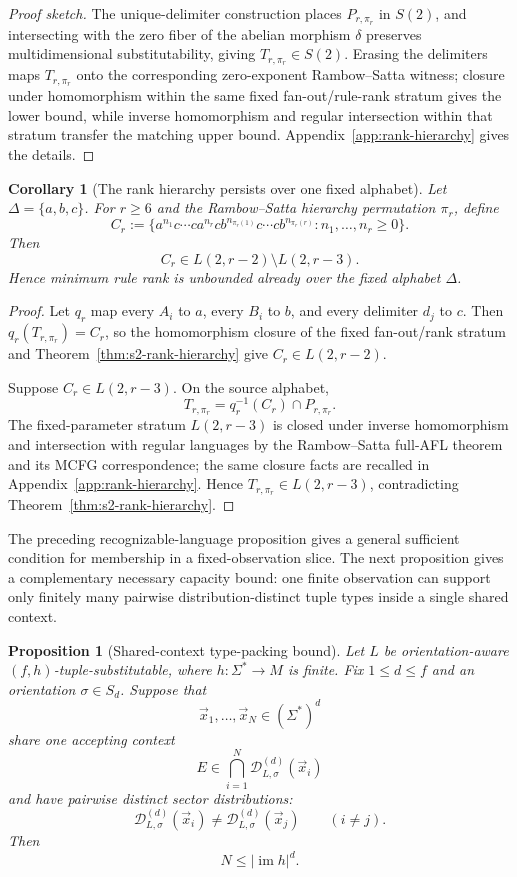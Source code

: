 \documentclass[11pt,a4paper]{article}
\numberwithin{equation}{section}
\theoremstyle{plain}
\newtheorem{proposition}[theorem]{Proposition}
\newtheorem{corollary}[theorem]{Corollary}
\theoremstyle{definition}
\theoremstyle{remark}
\newcommand{\D}{\mathcal{D}}
\newcommand{\tuple}[1]{\vec{#1}}
\begin{document}
\begin{proof}[Proof sketch]
The unique-delimiter construction places $P_{r,\pi_r}$ in $S(2)$, and
intersecting with the zero fiber of the abelian morphism $\delta$ preserves
multidimensional substitutability, giving $T_{r,\pi_r}\in S(2)$.  Erasing the
delimiters maps $T_{r,\pi_r}$ onto the corresponding zero-exponent
Rambow--Satta witness; closure under homomorphism within the same fixed
fan-out/rule-rank stratum gives the lower bound, while inverse homomorphism and
regular intersection within that stratum transfer the matching upper bound.  Appendix~\ref{app:rank-hierarchy} gives the details.
\end{proof}


\begin{corollary}[The rank hierarchy persists over one fixed alphabet]
\label{cor:fixed-alphabet-rank-hierarchy}
Let $\Delta=\{a,b,c\}$.  For $r\ge6$ and the Rambow--Satta hierarchy
permutation $\pi_r$, define
\[
 C_r:=\{a^{n_1}c\cdots ca^{n_r}c
 b^{n_{\pi_r(1)}}c\cdots cb^{n_{\pi_r(r)}}:
 n_1,\ldots,n_r\ge0\}.
\]
Then
\[
  C_r\in L(2,r-2)\setminus L(2,r-3).
\]
Hence minimum rule rank is unbounded already over the fixed alphabet $\Delta$.
\end{corollary}

\begin{proof}
Let $q_r$ map every $A_i$ to $a$, every $B_i$ to $b$, and every delimiter
$d_j$ to $c$.  Then $q_r(T_{r,\pi_r})=C_r$, so the homomorphism closure of
the fixed fan-out/rank stratum and
Theorem~\ref{thm:s2-rank-hierarchy} give $C_r\in L(2,r-2)$.

Suppose $C_r\in L(2,r-3)$.  On the source alphabet,
\[
  T_{r,\pi_r}=q_r^{-1}(C_r)\cap P_{r,\pi_r}.
\]
The fixed-parameter stratum $L(2,r-3)$ is closed under inverse homomorphism and
intersection with regular languages by the Rambow--Satta full-AFL theorem and
its MCFG correspondence; the same closure facts are recalled in
Appendix~\ref{app:rank-hierarchy}.  Hence
$T_{r,\pi_r}\in L(2,r-3)$, contradicting
Theorem~\ref{thm:s2-rank-hierarchy}.
\end{proof}

The preceding recognizable-language proposition gives a general sufficient
condition for membership in a fixed-observation slice.  The next proposition
gives a complementary necessary capacity bound: one finite observation can
support only finitely many pairwise distribution-distinct tuple types inside a
single shared context.

\begin{proposition}[Shared-context type-packing bound]
\label{prop:shared-context-packing}
Let $L$ be orientation-aware $(f,h)$-tuple-substitutable, where
$h:\Sigma^*\to M$ is finite.  Fix $1\le d\le f$ and an orientation
$\sigma\in S_d$.  Suppose that
\[
  \tuple x_1,\ldots,\tuple x_N\in(\Sigma^*)^d
\]
share one accepting context
\[
  E\in\bigcap_{i=1}^N \D_{L,\sigma}^{(d)}(\tuple x_i)
\]
and have pairwise distinct sector distributions:
\[
  \D_{L,\sigma}^{(d)}(\tuple x_i)
  \ne
  \D_{L,\sigma}^{(d)}(\tuple x_j)
  \qquad(i\ne j).
\]
Then
\[
  N\le |\operatorname{im}h|^d.
\]
\end{proposition}
\end{document}
